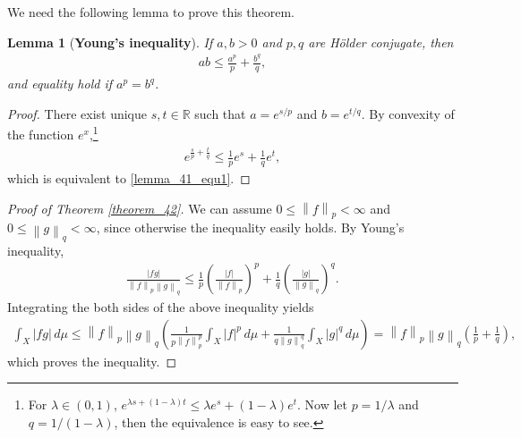 \documentclass[11pt]{book}
\newtheorem{lemma}{Lemma}[chapter]
\theoremstyle{definition}
\numberwithin{equation}{chapter}
\begin{document}
We need the following lemma to prove this theorem.

\begin{lemma}[{\bf Young's inequality}]\label{lemma_41}
If $a, b > 0$ and $p, q$ are Hölder conjugate, then
\begin{align}\label{lemma_41_equ1}
    ab \leq \frac{a^p}{p} + \frac{b^q}{q},
\end{align}
and equality hold if $a^p = b^q$.
\end{lemma}
\begin{proof}
There exist unique $s,t \in \mathbb{R}$ such that $a = e^{s/p}$ and $b = e^{t/q}$. By convexity of the function $e^x$,\footnote{For $\lambda \in (0,1)$, $e^{\lambda s + (1-\lambda)t} \leq \lambda e^s + (1-\lambda) e^t$. Now let $p = 1/\lambda$ and $q = 1/(1-\lambda)$, then the equivalence is easy to see.}
\begin{align*}
    e^{\frac{s}{p}+\frac{t}{q}} \leq \frac{1}{p} e^s + \frac{1}{q} e^t,
\end{align*}
which is equivalent to \eqref{lemma_41_equ1}.
\end{proof}

\begin{proof}[Proof of Theorem \ref{theorem_42}]
We can assume $0 \leq \left\|f\right\|_p < \infty$ and $0 \leq \left\|g\right\|_q < \infty$, since otherwise the inequality easily holds. By Young's inequality,
\begin{align*}
    \frac{\left|fg\right|}{\left\|f\right\|_p \left\|g\right\|_q} \leq \frac{1}{p} \left(\frac{\left|f\right|}{\left\|f\right\|_p}\right)^p + \frac{1}{q} \left(\frac{\left|g\right|}{\left\|g\right\|_q}\right)^q.
\end{align*}
Integrating the both sides of the above inequality yields
\begin{align*}
    \int_X \left|fg\right|\,d\mu \leq \left\|f\right\|_p \left\|g\right\|_q \left(\frac{1}{p\left\|f\right\|_p^p} \int_X \left|f\right|^p\,d\mu + \frac{1}{q\left\|g\right\|_q^q} \int_X \left|g\right|^q\,d\mu \right) = \left\|f\right\|_p \left\|g\right\|_q \left(\frac{1}{p} + \frac{1}{q}\right),
\end{align*}
which proves the inequality.
\end{proof}

\medskip
\end{document}
